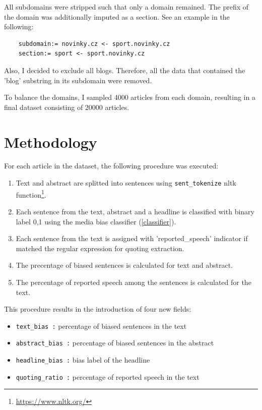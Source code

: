 All subdomains were stripped such that only a domain remained. The prefix of the domain was additionally imputed as a section. See an example in the following:
\begin{verbatim}
    subdomain:= novinky.cz <- sport.novinky.cz 
    section:= sport <- sport.novinky.cz
\end{verbatim}

Also, I decided to exclude all blogs. Therefore, all the data that contained the 'blog' substring in its subdomain were removed.

To balance the domains, I sampled 4000 articles from each domain, resulting in a final dataset consisting of 20000 articles.


\section{Methodology}
For each article in the dataset, the following procedure was executed:
\begin{enumerate}
    \item Text and abstract are splitted into sentences using \verb|sent_tokenize| nltk function\footnote{\url{https://www.nltk.org/}}.
    \item Each sentence from the text, abstract and a headline is classified with binary label 0,1 using the media bias classifier (\ref{classifier}).
    \item Each sentence from the text is assigned with 'reported\_speech' indicator if matched the regular expression for quoting extraction. 
    \item The precentage of biased sentences is calculated for text and abstract.
    \item The percentage of reported speech among the sentences is calculated for the text.
\end{enumerate}

This procedure results in the introduction of four new fields:
\begin{itemize}
    \item \verb|text_bias :| percentage of biased sentences in the text
    \item \verb|abstract_bias :| percentage of biased sentences in the abstract
    \item \verb|headline_bias :| bias label of the headline
    \item \verb|quoting_ratio :| percentage of reported speech in the text     
\end{itemize}



